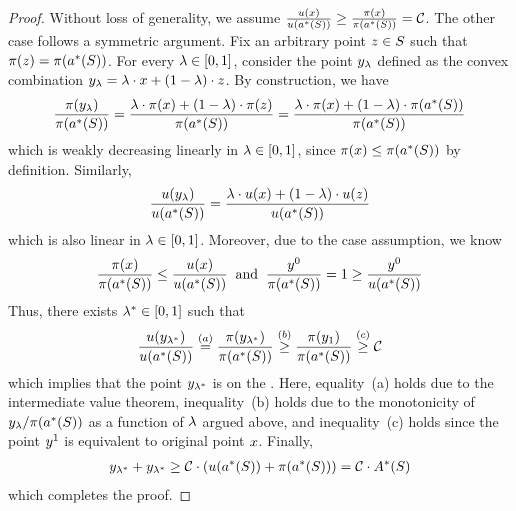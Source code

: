 \begin{proof}
    Without loss of generality, we assume $\frac{u(x)}{u(a^*(S))} \geq \frac{\pi(x)}{\pi(a^*(S))} = \mathcal{C}$. The other case follows a symmetric argument. Fix an arbitrary point $z\in {S}$ such that $\pi(z)=\pi(a^*(S))$. For every $\lambda\in[0, 1]$, consider the point $y_{\lambda}$ defined as the convex combination $y_{\lambda}=\lambda \cdot x + (1-\lambda)\cdot z$. By construction, we have
    \begin{align*}
        \frac{\pi(y_{\lambda})}{\pi(a^*(S))} 
        =
        \frac{\lambda\cdot \pi(x) + (1-\lambda)\cdot \pi(z)}{\pi(a^*(S))} 
        =
        \frac{\lambda\cdot \pi(x) + (1-\lambda)\cdot \pi(a^*(S))}{\pi(a^*(S))} 
    \end{align*}
    which is weakly decreasing linearly in $\lambda\in[0, 1]$, since $\pi(x) \leq \pi(a^*(S))$ by definition. Similarly, 
    \begin{align*}
        \frac{u(y_{\lambda})}{u(a^*(S))} 
        =
        \frac{\lambda\cdot u(x) + (1-\lambda)\cdot u(z)}{u(a^*(S))} 
    \end{align*}
    which is also linear in $\lambda\in[0, 1]$. Moreover, due to the case assumption, we know 
    \begin{align*}
        \frac{\pi(x)}{\pi(a^*(S))} 
        \leq 
        \frac{u(x)}{u(a^*(S))}
        \;\;
        \mbox{and}
        \;\;
        \frac{y^{0}}{\pi(a^*(S))} = 1
        \geq 
        \frac{y^{0}}{u(a^*(S))}
    \end{align*}
    Thus, there exists $\lambda^*\in[0, 1]$ such that 
    \begin{align*}
        \frac{u(y_{\lambda^*})}{u(a^*(S))} 
        \overset{(a)}{=} 
        \frac{\pi(y_{\lambda^*})}{\pi(a^*(S))} 
        \overset{(b)}{\geq}
        \frac{\pi(y_{1})}{\pi(a^*(S))} 
        \overset{(c)}{\geq}
        \mathcal{C}
    \end{align*}
    which implies that the point $y_{\lambda^*}$ is on the {\ksline}. Here, equality~(a) holds due to the intermediate value theorem, inequality~(b) holds due to the monotonicity of $
    {y_{\lambda}}/{\pi(a^*(S))}$ as a function of $\lambda$ argued above,
    and 
    inequality~(c) holds since the point $y^{1}$ is equivalent to original point $x$. Finally,
    \begin{align*}
        y_{\lambda^*} + y_{\lambda^*} \geq \mathcal{C} \cdot (u(a^*(S)) + \pi(a^*(S))) = \mathcal{C} \cdot A^*(S)
    \end{align*}
    which completes the proof. 
\end{proof}

